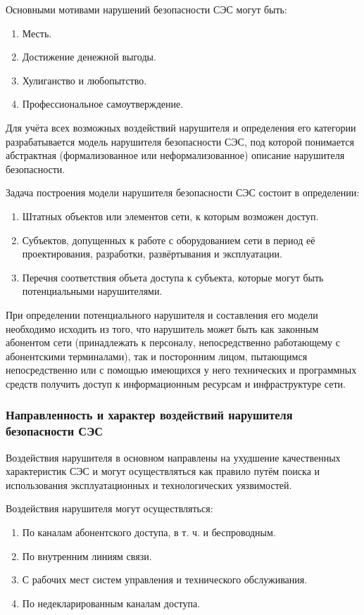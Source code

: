 \documentclass[12pt, russian, oneside, article]{ncc}
\begin{document}
Основными мотивами нарушений безопасности СЭС могут быть:
\begin{enumerate}
\item Месть.
\item Достижение денежной выгоды.
\item Хулиганство и любопытство.
\item Профессиональное самоутверждение.
\end{enumerate}

Для учёта всех возможных воздействий нарушителя и определения его категории разрабатывается модель нарушителя безопасности СЭС, под которой понимается абстрактная (формализованное или неформализованное) описание нарушителя безопасности.

Задача построения модели нарушителя безопасности СЭС состоит в определении:
\begin{enumerate}
\item Штатных объектов или элементов сети, к которым возможен доступ.
\item Субъектов, допущенных к работе с оборудованием сети в период её проектирования, разработки, развёртывания и эксплуатации.
\item Перечня соответствия объета доступа к субъекта, которые могут быть потенциальными нарушителями.
\end{enumerate}

При определении потенциального нарушителя и составления его модели необходимо исходить из того, что нарушитель может быть как законным абонентом сети (принадлежать к персоналу, непосредственно работающему с абонентскими терминалами), так и посторонним лицом, пытающимся непосредственно или с помощью имеющихся у него технических и программных средств получить доступ к информационным ресурсам и инфраструктуре сети.
\subsubsection{Направленность и характер воздействий нарушителя безопасности СЭС}
\label{sec-1_2_2}


Воздействия нарушителя в основном направлены на ухудшение качественных характеристик СЭС и могут осуществляться как правило путём поиска и использования эксплуатационных и технологических уязвимостей.

Воздействия нарушителя могут осуществляться:
\begin{enumerate}
\item По каналам абонентского доступа, в т. ч. и беспроводным.
\item По внутренним линиям связи.
\item С рабочих мест систем управления и технического обслуживания.
\item По недекларированным каналам доступа.
\end{enumerate}
\end{document}
